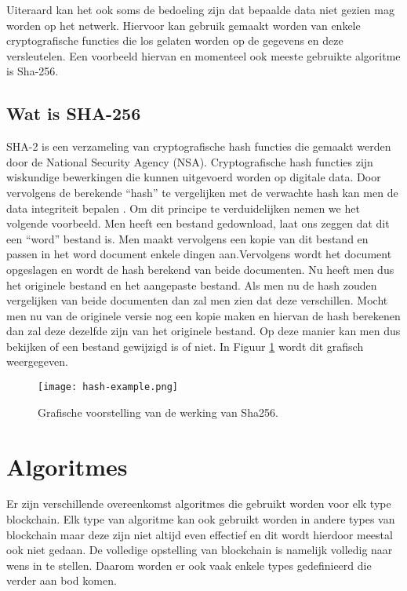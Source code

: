 Uiteraard kan het ook soms de bedoeling zijn dat bepaalde data niet gezien mag worden op het netwerk. Hiervoor kan gebruik gemaakt worden van enkele cryptografische functies die los gelaten worden op de gegevens en deze versleutelen. Een voorbeeld hiervan en momenteel ook meeste gebruikte algoritme  is Sha-256. 

\subsection{Wat is SHA-256}
SHA-2 is een verzameling van cryptografische hash functies die gemaakt werden door de National Security Agency (NSA). Cryptografische hash functies zijn wiskundige bewerkingen die kunnen uitgevoerd worden op digitale data. Door vervolgens de berekende ``hash'' te vergelijken met de verwachte hash kan men de data integriteit bepalen \textcite{Fisher2017}. Om dit principe te verduidelijken nemen we het volgende voorbeeld. Men heeft een bestand gedownload, laat ons zeggen dat dit een ``word'' bestand is. Men maakt vervolgens een kopie van dit bestand en passen in het word document enkele dingen aan.Vervolgens wordt het document opgeslagen en wordt de hash berekend van beide documenten. Nu heeft men dus het originele bestand en het aangepaste bestand. Als men nu de hash zouden vergelijken van beide documenten dan zal men zien dat deze verschillen. Mocht men nu van de originele versie nog een kopie maken en hiervan de hash berekenen dan zal deze dezelfde zijn van het originele bestand. Op deze manier kan men dus bekijken of een bestand gewijzigd is of niet. In Figuur \ref{fig:hash-example} wordt dit grafisch weergegeven.

\begin{figure}
	\texttt{[image: hash-example.png]}
	\caption{Grafische voorstelling van de werking van Sha256.}
	\label{fig:hash-example}
\end{figure}

\section{Algoritmes}
Er zijn verschillende overeenkomst algoritmes die gebruikt worden voor elk type blockchain. Elk type van algoritme kan ook gebruikt worden in andere types van blockchain maar deze zijn niet altijd even effectief en dit wordt hierdoor meestal ook niet gedaan. De volledige opstelling van blockchain is namelijk volledig naar wens in te stellen. Daarom worden er ook vaak enkele types gedefinieerd die verder aan bod komen.

